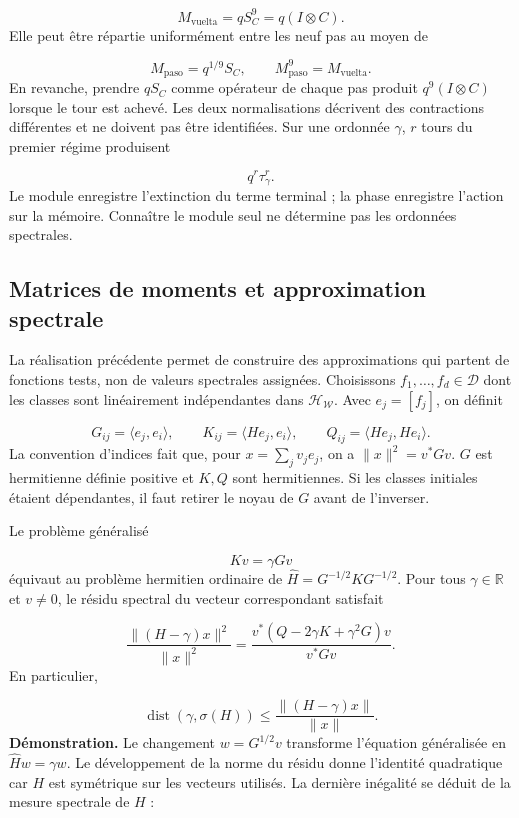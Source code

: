 \[
M_{\mathrm{vuelta}}=qS_C^9
=q(I\otimes C).
\]
Elle peut être répartie uniformément entre les neuf pas au moyen de

\[
M_{\mathrm{paso}}=q^{1/9}S_C,\qquad
M_{\mathrm{paso}}^9=M_{\mathrm{vuelta}}.
\]
En revanche, prendre \(qS_C\) comme opérateur de chaque pas produit \(q^9(I\otimes C)\) lorsque le tour est achevé. Les deux normalisations décrivent des contractions différentes et ne doivent pas être identifiées. Sur une ordonnée \(\gamma\), \(r\) tours du premier régime produisent

\[
q^r\tau_\gamma^r.
\]
Le module enregistre l'extinction du terme terminal ; la phase enregistre l'action sur la mémoire. Connaître le module seul ne détermine pas les ordonnées spectrales.

\subsection{Matrices de moments et approximation spectrale}
\label{rz:galerkin}
La réalisation précédente permet de construire des approximations qui partent de fonctions tests, non de valeurs spectrales assignées. Choisissons \(f_1,\ldots,f_d\in\mathcal D\) dont les classes sont linéairement indépendantes dans \(\mathcal H_{\mathscr W}\). Avec \(e_j=[f_j]\), on définit

\[
G_{ij}=\langle e_j,e_i\rangle,\qquad
K_{ij}=\langle He_j,e_i\rangle,\qquad
Q_{ij}=\langle He_j,He_i\rangle.
\]
La convention d'indices fait que, pour \(x=\sum_jv_je_j\), on a \(\|x\|^2=v^*Gv\). \(G\) est hermitienne définie positive et \(K,Q\) sont hermitiennes. Si les classes initiales étaient dépendantes, il faut retirer le noyau de \(G\) avant de l'inverser.

Le problème généralisé

\[
Kv=\gamma Gv
\]
équivaut au problème hermitien ordinaire de \(\widehat H=G^{-1/2}KG^{-1/2}\). Pour tous \(\gamma\in\mathbb R\) et \(v\neq0\), le résidu spectral du vecteur correspondant satisfait

\[
\frac{\|(H-\gamma)x\|^2}{\|x\|^2}
=\frac{v^*(Q-2\gamma K+\gamma^2G)v}{v^*Gv}.
\]
En particulier,

\[
\operatorname{dist}(\gamma,\sigma(H))
\leq\frac{\|(H-\gamma)x\|}{\|x\|}.
\]
\textbf{Démonstration.} Le changement \(w=G^{1/2}v\) transforme l’équation généralisée en \(\widehat Hw=\gamma w\). Le développement de la norme du résidu donne l’identité quadratique car \(H\) est symétrique sur les vecteurs utilisés. La dernière inégalité se déduit de la mesure spectrale de \(H\) :

